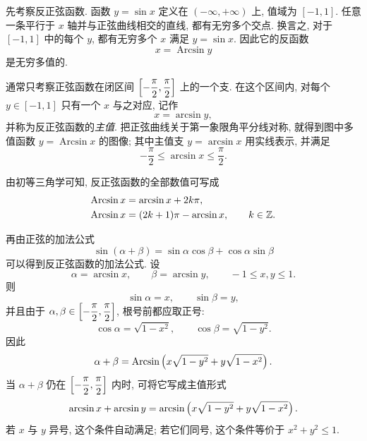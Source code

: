 \begin{figure}
    \vspace{-1.2cm}
\end{figure}
先考察反正弦函数. 函数 $y=\sin x$ 定义在 $(-\infty,+\infty)$ 上,
值域为 $[-1,1]$. 任意一条平行于 $x$ 轴并与正弦曲线相交的直线,
都有无穷多个交点. 换言之, 对于 $[-1,1]$ 中的每个 $y$,
都有无穷多个 $x$ 满足 $y=\sin x$. 因此它的反函数
$$
x=\operatorname{Arcsin}y
$$
是无穷多值的.

通常只考察正弦函数在闭区间
$\left[ -\dfrac{\pi}{2},\dfrac{\pi}{2} \right]$ 上的一个支.
在这个区间内, 对每个 $y\in[-1,1]$ 只有一个 $x$ 与之对应, 记作
$$
x=\arcsin y,
$$
并称为反正弦函数的\emph{主值}.
把正弦曲线关于第一象限角平分线对称, 就得到图中多值函数
$y=\operatorname{Arcsin}x$ 的图像; 其中主值支 $y=\arcsin x$ 用实线表示, 并满足
$$
-\frac{\pi}{2}\leqslant\arcsin x\leqslant\frac{\pi}{2}.
$$

由初等三角学可知, 反正弦函数的全部数值可写成
$$
\begin{aligned}
\operatorname{Arcsin}x&=\arcsin x+2k\pi,\\
\operatorname{Arcsin}x&=(2k+1)\pi-\arcsin x,
\qquad k\in\mathbb{Z}.
\end{aligned}
$$

再由正弦的加法公式
$$
\sin(\alpha+\beta)=\sin\alpha\cos\beta+\cos\alpha\sin\beta
$$
可以得到反正弦函数的加法公式. 设
$$
\alpha=\arcsin x,\qquad\beta=\arcsin y,
\qquad -1\leqslant x,y\leqslant1.
$$
则
$$
\sin\alpha=x,\qquad \sin\beta=y,
$$
并且由于 $\alpha,\beta\in\left[ -\dfrac{\pi}{2},\dfrac{\pi}{2} \right]$,
根号前都应取正号:
$$
\cos\alpha=\sqrt{1-x^2},\qquad
\cos\beta=\sqrt{1-y^2}.
$$
因此
$$
\alpha+\beta
=\operatorname{Arcsin}\left( x\sqrt{1-y^2}+y\sqrt{1-x^2} \right).
$$
当 $\alpha+\beta$ 仍在
$\left[ -\dfrac{\pi}{2},\dfrac{\pi}{2} \right]$ 内时, 可将它写成主值形式
$$
\arcsin x+\arcsin y
=\arcsin\left( x\sqrt{1-y^2}+y\sqrt{1-x^2} \right).
$$
若 $x$ 与 $y$ 异号, 这个条件自动满足;
若它们同号, 这个条件等价于 $x^2+y^2\leqslant1$.

